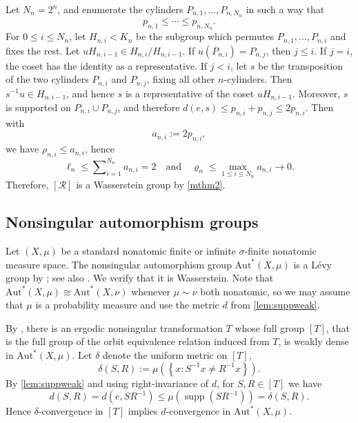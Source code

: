 \documentclass{amsart}
\numberwithin{equation}{subsection}
\theoremstyle{plain}
\theoremstyle{definition}
\theoremstyle{plain}
\begin{document}
\smallskip

Let \(N_{n}=2^{n}\), and enumerate the cylinders \(P_{n,1},\dotsc,P_{n,N_{n}}\) in such a way that
\[p_{n,1}\leq\dotsm\leq p_{n,N_{n}}.\]
For \(0\leq i\leq N_{n}\), let \(H_{n,i}<K_{n}\) be the subgroup which permutes \(P_{n,1},\dotsc,P_{n,i}\) and fixes the rest. Let \(uH_{n,i-1}\in H_{n,i}/H_{n,i-1}\). If \(u\left(P_{n,i}\right)=P_{n,j}\), then \(j\leq i\). If \(j=i\), the coset has the identity as a representative. If \(j<i\), let \(s\) be the transposition of the two cylinders \(P_{n,i}\) and \(P_{n,j}\), fixing all other \(n\)-cylinders. Then \(s^{-1}u\in H_{n,i-1}\), and hence \(s\) is a representative of the coset \(uH_{n,i-1}\). Moreover, \(s\) is supported on \(P_{n,i}\cup P_{n,j}\), and therefore \(d\left(e,s\right)\leq p_{n,i}+p_{n,j}\leq2p_{n,i}\). Then with
\[a_{n,i}:=2p_{n,i},\]
we have \(\rho_{n,i}\leq a_{n,i}\), hence
\[\ell_{n}\leq\sum\nolimits_{i=1}^{N_{n}}a_{n,i}=2\quad\text{and}\quad\varrho_{n}\leq\max_{1\leq i\leq N_{n}}a_{n,i}\to0.\]
Therefore, \(\left[\mathcal{R}\right]\) is a Wasserstein group by \cref{mthm2}.

\subsection{Nonsingular automorphism groups}

Let \(\left(X,\mu\right)\) be a standard nonatomic finite or infinite \(\sigma\)-finite nonatomic measure space. The nonsingular automorphism group \(\mathrm{Aut}^{\ast}\left(X,\mu\right)\) is a L\'{e}vy group by \cite[Thm.~6.1]{giordano2007some}; see also \cite[\S4.6]{Pestov2006}. We verify that it is Wasserstein. Note that \(\mathrm{Aut}^{\ast}\left(X,\mu\right)\cong\mathrm{Aut}^{\ast}\left(X,\nu\right)\) whenever \(\mu\sim\nu\) both nonatomic, so we may assume that \(\mu\) is a probability measure and use the metric \(d\) from \cref{lem:suppweak}.

\smallskip

By \cite[Prop.~6.2]{giordano2007some}, there is an ergodic nonsingular transformation \(T\) whose full group \(\left[T\right]\), that is the full group of the orbit equivalence relation induced from \(T\), is weakly dense in \(\mathrm{Aut}^{\ast}\left(X,\mu\right)\). Let \(\delta\) denote the uniform metric on \(\left[T\right]\),
\[\delta\left(S,R\right):=\mu\left(\left\{x:S^{-1}x\neq R^{-1}x\right\}\right).\]
By \cref{lem:suppweak} and using right-invariance of \(d\), for \(S,R\in\left[T\right]\) we have
\[d\left(S,R\right)=d\left(e,SR^{-1}\right)\leq\mu\left(\operatorname{supp}\left(SR^{-1}\right)\right)=\delta\left(S,R\right).\]
Hence \(\delta\)-convergence in \(\left[T\right]\) implies \(d\)-convergence in \(\mathrm{Aut}^{\ast}\left(X,\mu\right)\).
\end{document}
